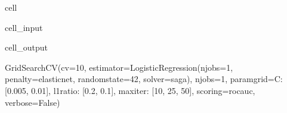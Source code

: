 \documentclass[letterpaper,10pt,english]{jupyterBook}
\begin{document}
\begin{sphinxuseclass}{cell}
\begin{sphinxVerbatimInput}
\begin{sphinxuseclass}{cell_input}
\end{sphinxuseclass}\end{sphinxVerbatimInput}
\begin{sphinxVerbatimOutput}

\begin{sphinxuseclass}{cell_output}
\begin{sphinxVerbatim}[commandchars=\\\{\}]
GridSearchCV(cv=10,
             estimator=LogisticRegression(n\PYGZus{}jobs=\PYGZhy{}1, penalty=\PYGZsq{}elasticnet\PYGZsq{},
                                          random\PYGZus{}state=42, solver=\PYGZsq{}saga\PYGZsq{}),
             n\PYGZus{}jobs=\PYGZhy{}1,
             param\PYGZus{}grid=\PYGZob{}\PYGZsq{}C\PYGZsq{}: [0.005, 0.01], \PYGZsq{}l1\PYGZus{}ratio\PYGZsq{}: [0.2, 0.1],
                         \PYGZsq{}max\PYGZus{}iter\PYGZsq{}: [10, 25, 50]\PYGZcb{},
             scoring=\PYGZsq{}roc\PYGZus{}auc\PYGZsq{}, verbose=False)
\end{sphinxVerbatim}

\end{sphinxuseclass}\end{sphinxVerbatimOutput}

\end{sphinxuseclass}
\end{document}
